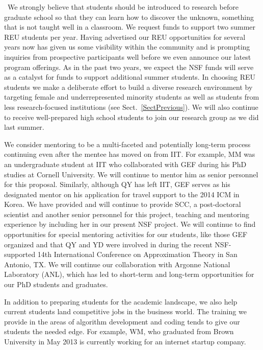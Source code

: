 \begin{description}[leftmargin=2.5ex]
\item[Providing Research Experiences for Undergraduates and High School Students]\ We \linebreak[4] strongly believe that students should be introduced to research before graduate school so that they can learn how to discover the unknown, something that is not taught well in a classroom. We request funds to support two summer REU students per year. Having advertised our REU opportunities for several years now has given us some visibility within the community and is prompting inquiries from prospective participants well before we even announce our latest program offerings. As in the past two years, we expect the NSF funds will serve as a catalyst for funds to support additional summer students. In choosing REU students we make a deliberate effort to build a diverse research environment by targeting female and underrepresented minority students as well as students from less research-focused institutions (see Sect.~\ref{SectPrevious}). We will also continue to receive well-prepared high school students to join our research group as we did last summer.

\item[Preparing Students for Academic Careers] We consider mentoring to be a multi-faceted and potentially long-term process continuing even after the mentee has moved on from IIT.  For example, MM was an undergraduate student at IIT who collaborated with GEF during his PhD studies at Cornell University.  We will continue to mentor him as senior personnel for this proposal. Similarly, although QY has left IIT, GEF serves as his designated mentor on his application for travel support to the 2014 ICM in Korea. We have provided and will continue to provide SCC, a post-doctoral scientist and another senior personnel for this project, teaching and mentoring experience by including her in our present NSF project.  We will continue to find opportunities for special mentoring activities for our students, like those GEF organized and that QY and YD were involved in during the recent NSF-supported 14th International Conference on Approximation Theory in San Antonio, TX.  We  will continue our collaboration with Argonne National Laboratory (ANL), which has led to short-term and long-term opportunities for our PhD students and graduates.

\item[Preparing Students for Industry Careers]
In addition to preparing students for the academic landscape, we also help current students land competitive jobs in the business world. The training we provide in the areas of algorithm development and coding tends to give our students the needed edge. For example, WM, who graduated from Brown University in May 2013 is currently working for an internet startup company.


\end{description}
